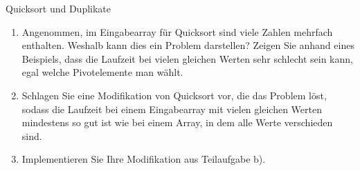 \documentclass[11pt,a4paper]{article}
\begin{document}
\begin{aufgabe}{3}{Quicksort und Duplikate}
    \begin{enumerate}
        \item Angenommen, im Eingabearray für Quicksort sind viele Zahlen mehrfach enthalten.
        Weshalb kann dies ein Problem darstellen?
        Zeigen Sie anhand eines Beispiels, dass die Laufzeit bei vielen gleichen Werten sehr schlecht sein kann, egal welche Pivotelemente man wählt.

        \item Schlagen Sie eine Modifikation von Quicksort vor, die das Problem löst, sodass die Laufzeit bei einem Eingabearray mit vielen gleichen Werten mindestens so gut ist wie bei einem Array, in dem alle Werte verschieden sind.

        \item Implementieren Sie Ihre Modifikation aus Teilaufgabe b).
    \end{enumerate}
\end{aufgabe}
\end{document}

